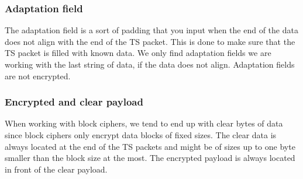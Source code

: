 
\subsubsection{Adaptation field}
The adaptation field is a sort of padding that you input when the end of the 
data does not align with the end of the TS packet. This is done to make sure 
that the TS packet is filled with known data. We only find adaptation fields we 
are working with the last string of data, if the data does not align. Adaptation 
fields are not encrypted. \cite[pp. 10--11]{DVB:2013}

\subsubsection{Encrypted and clear payload}
When working with block ciphers, we tend to end up with clear bytes of data 
since block ciphers only encrypt data blocks of fixed sizes. The clear data 
is always located at the end of the TS packets and might be of sizes up to one 
byte smaller than the block size at the most. The encrypted payload is always 
located in front of the clear payload. \cite[pp. 10--11]{DVB:2013}

